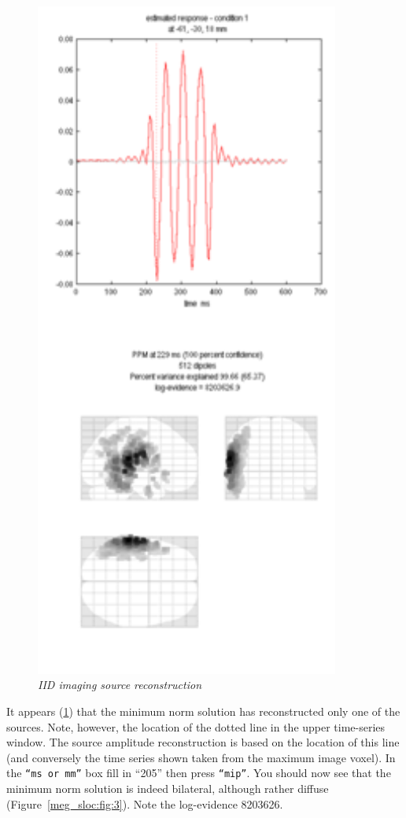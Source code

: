 \begin{figure}
\begin{center}
\includegraphics[width=100mm]{meg_sloc/slide2}
\caption{\em IID imaging source reconstruction \label{meg_sloc:fig:2}}
\end{center}
\end{figure}

 
It appears (\ref{meg_sloc:fig:2}) that the minimum norm solution has reconstructed only one of the sources. Note, however, the location of the dotted line in the upper time-series window. The source amplitude reconstruction is based on the location of this line (and conversely the time series shown taken from the maximum image voxel). In the \texttt{``ms or mm''} box fill in ``205'' then press \texttt{``mip''}. You should now see that the minimum norm solution is indeed bilateral, although rather diffuse (Figure~\ref{meg_sloc:fig:3}).  Note the log-evidence 8203626.

